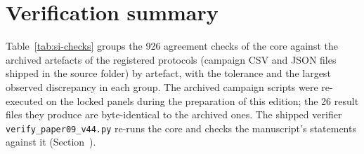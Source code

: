 \section{Verification summary}\label{si:checks}
Table~\ref{tab:si-checks} groups the 926 agreement checks of the core against the archived artefacts of the registered protocols (campaign CSV and JSON files shipped in the source folder) by artefact, with the tolerance and the largest observed discrepancy in each group. The archived campaign scripts were re-executed on the locked panels during the preparation of this edition; the 26 result files they produce are byte-identical to the archived ones. The shipped verifier \texttt{verify\_paper09\_v44.py} re-runs the core and checks the manuscript's statements against it (Section~).

